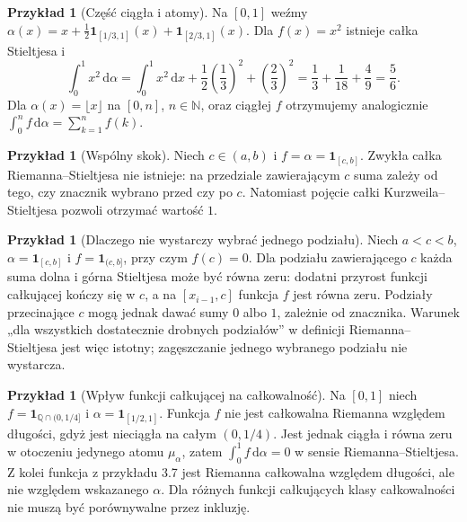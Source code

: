 \documentclass[11pt,a4paper]{article}
\numberwithin{equation}{section}
\theoremstyle{plain}
\theoremstyle{definition}
\newtheorem{przyklad}[twierdzenie]{Przykład}
\theoremstyle{remark}
\newcommand{\N}{\mathbb N}
\newcommand{\Q}{\mathbb Q}
\newcommand{\ind}[1]{\mathbf 1_{#1}}
\begin{document}
\begin{przyklad}[Część ciągła i atomy]
Na $[0,1]$ weźmy $\alpha(x)=x+\tfrac12\ind{[1/3,1]}(x)+\ind{[2/3,1]}(x)$. Dla $f(x)=x^2$ istnieje całka Stieltjesa i
\[
\int_0^1x^2\,\mathrm d\alpha=\int_0^1x^2\,\mathrm dx+\frac12\left(\frac13\right)^2+\left(\frac23\right)^2=\frac13+\frac1{18}+\frac49=\frac56.
\]
Dla $\alpha(x)=\lfloor x\rfloor$ na $[0,n]$, $n\in\N$, oraz ciągłej $f$ otrzymujemy analogicznie $\int_0^n f\,\mathrm d\alpha=\sum_{k=1}^n f(k)$.
\end{przyklad}
\begin{przyklad}[Wspólny skok]
Niech $c\in(a,b)$ i $f=\alpha=\ind{[c,b]}$. Zwykła całka Riemanna--Stieltjesa nie istnieje: na przedziale zawierającym $c$ suma zależy od tego, czy znacznik wybrano przed czy po $c$. Natomiast pojęcie całki Kurzweila--Stieltjesa pozwoli otrzymać wartość $1$.
\end{przyklad}
\begin{przyklad}[Dlaczego nie wystarczy wybrać jednego podziału]
Niech $a<c<b$, $\alpha=\ind{[c,b]}$ i $f=\ind{(c,b]}$, przy czym $f(c)=0$. Dla podziału zawierającego $c$ każda suma dolna i górna Stieltjesa może być równa zeru: dodatni przyrost funkcji całkującej kończy się w $c$, a na $[x_{i-1},c]$ funkcja $f$ jest równa zeru. Podziały przecinające $c$ mogą jednak dawać sumy $0$ albo $1$, zależnie od znacznika. Warunek „dla wszystkich dostatecznie drobnych podziałów” w definicji Riemanna--Stieltjesa jest więc istotny; zagęszczanie jednego wybranego podziału nie wystarcza.
\end{przyklad}
\begin{przyklad}[Wpływ funkcji całkującej na całkowalność]
Na $[0,1]$ niech $f=\ind{\Q\cap(0,1/4]}$ i $\alpha=\ind{[1/2,1]}$. Funkcja $f$ nie jest całkowalna Riemanna względem długości, gdyż jest nieciągła na całym $(0,1/4)$. Jest jednak ciągła i równa zeru w otoczeniu jedynego atomu $\mu_\alpha$, zatem $\int_0^1 f\,\mathrm d\alpha=0$ w sensie Riemanna--Stieltjesa. Z kolei funkcja z przykładu 3.7 jest Riemanna całkowalna względem długości, ale nie względem wskazanego $\alpha$. Dla różnych funkcji całkujących klasy całkowalności nie muszą być porównywalne przez inkluzję.
\end{przyklad}

\end{document}
